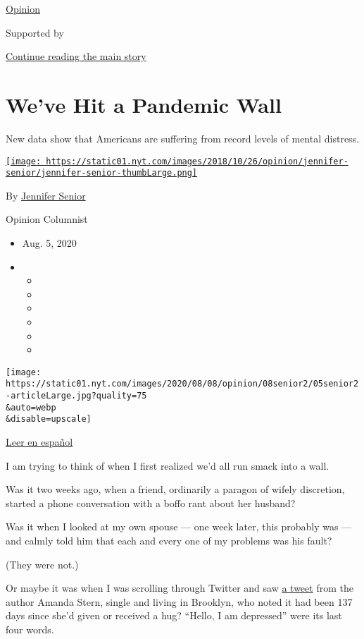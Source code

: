 \href{/section/opinion}{Opinion}

Supported by

\protect\hyperlink{after-sponsor}{Continue reading the main story}

\hypertarget{weve-hit-a-pandemic-wall}{%
\section{We've Hit a Pandemic Wall}\label{weve-hit-a-pandemic-wall}}

New data show that Americans are suffering from record levels of mental
distress.

\href{https://www.nytimes.com/by/jennifer-senior}{\texttt{[image: https://static01.nyt.com/images/2018/10/26/opinion/jennifer-senior/jennifer-senior-thumbLarge.png]}}

By \href{https://www.nytimes.com/by/jennifer-senior}{Jennifer Senior}

Opinion Columnist

\begin{itemize}
\item
  Aug. 5, 2020
\item
  \begin{itemize}
  \item
  \item
  \item
  \item
  \item
  \item
  \end{itemize}
\end{itemize}

\texttt{[image: https://static01.nyt.com/images/2020/08/08/opinion/08senior2/05senior2-articleLarge.jpg?quality=75\\\&auto=webp\\\&disable=upscale]}

\href{https://www.nytimes.com/es/2020/08/07/espanol/opinion/ansiedad-coronavirus.html}{Leer
en español}

I am trying to think of when I first realized we'd all run smack into a
wall.

Was it two weeks ago, when a friend, ordinarily a paragon of wifely
discretion, started a phone conversation with a boffo rant about her
husband?

Was it when I looked at my own spouse --- one week later, this probably
was --- and calmly told him that each and every one of my problems was
his fault?

(They were not.)

Or maybe it was when I was scrolling through Twitter and saw
\href{https://twitter.com/amandastern/status/1284639637252845570}{a
tweet} from the author Amanda Stern, single and living in Brooklyn, who
noted it had been 137 days since she'd given or received a hug? ``Hello,
I am depressed'' were its last four words.

